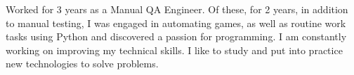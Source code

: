 \documentclass[a4paper, 12pt]{article}
\begin{document}
Worked for 3 years as a Manual QA Engineer.
Of these, for 2 years, in addition to manual testing, I was engaged in automating games,
as well as routine work tasks using Python and discovered a passion for programming.
I am constantly working on improving my technical skills.
I like to study and put into practice new technologies to solve problems.
\end{document}

